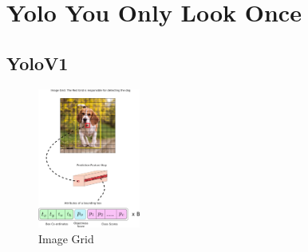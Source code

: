 \section{Yolo You Only Look Once}

\subsection{YoloV1}

\begin{figure}
  \centering
  \includegraphics[width=0.3\textwidth]{images/yolo/grid.png}
  \caption{Image Grid}
\end{figure}


